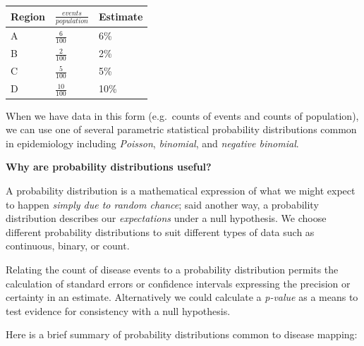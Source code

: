 \documentclass[
]{book}
\newenvironment{rmdnote}[1]
  {
  \begin{itemize}
  \renewcommand{\labelitemi}{
    \raisebox{-.7\height}[0pt][0pt]{
      {\setkeys{Gin}{width=3em,keepaspectratio}\texttt{[image: images/\#1]}}
    }
  }
  \setlength{\fboxsep}{1em}
  \begin{note}
  \item
  }
  {
  \end{note}
  \end{itemize}
  }
\begin{document}
\begin{longtable}[]{@{}lll@{}}
\toprule()
Region & \(\frac{events}{population}\) & Estimate \\
\midrule()
\endhead
A & \(\frac{6}{100}\) & 6\% \\
B & \(\frac{2}{100}\) & 2\% \\
C & \(\frac{5}{100}\) & 5\% \\
D & \(\frac{10}{100}\) & 10\% \\
\bottomrule()
\end{longtable}

When we have data in this form (e.g.~counts of events and counts of population), we can use one of several parametric statistical probability distributions common in epidemiology including \emph{Poisson}, \emph{binomial}, and \emph{negative binomial}.

\begin{rmdnote}{note}
\textbf{Why are probability distributions useful?}

A probability distribution is a mathematical expression of what we might expect to happen \emph{simply due to random chance}; said another way, a probability distribution describes our \emph{expectations} under a null hypothesis. We choose different probability distributions to suit different types of data such as continuous, binary, or count.

Relating the count of disease events to a probability distribution permits the calculation of standard errors or confidence intervals expressing the precision or certainty in an estimate. Alternatively we could calculate a \emph{p-value} as a means to test evidence for consistency with a null hypothesis.

\end{rmdnote}

Here is a brief summary of probability distributions common to disease mapping:
\end{document}
